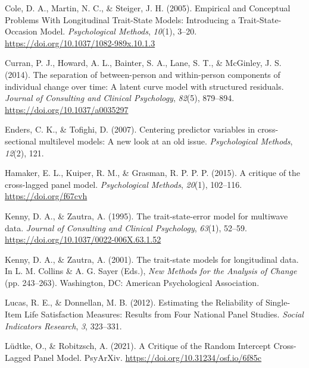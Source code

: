 \documentclass[
  english,
  man,floatsintext]{apa6}
\newlength{\cslhangindent}
\newlength{\cslentryspacingunit} %
\newenvironment{CSLReferences}[2] %
 {%
  \setlength{\parindent}{0pt}
  \ifodd #1
  \let\oldpar\par
  \def\par{\hangindent=\cslhangindent\oldpar}
  \fi
  \setlength{\parskip}{#2\cslentryspacingunit}
 }%
 {}
\begin{document}
\hypertarget{refs}{}
\begin{CSLReferences}{1}{0}
\leavevmode{}%
Cole, D. A., Martin, N. C., \& Steiger, J. H. (2005). Empirical and {Conceptual Problems With Longitudinal Trait-State Models}: {Introducing} a {Trait-State-Occasion Model}. \emph{Psychological Methods}, \emph{10}(1), 3--20. \url{https://doi.org/10.1037/1082-989x.10.1.3}

\leavevmode{}%
Curran, P. J., Howard, A. L., Bainter, S. A., Lane, S. T., \& McGinley, J. S. (2014). The separation of between-person and within-person components of individual change over time: {A} latent curve model with structured residuals. \emph{Journal of Consulting and Clinical Psychology}, \emph{82}(5), 879--894. \url{https://doi.org/10.1037/a0035297}

\leavevmode{}%
Enders, C. K., \& Tofighi, D. (2007). Centering predictor variables in cross-sectional multilevel models: {A} new look at an old issue. \emph{Psychological Methods}, \emph{12}(2), 121.

\leavevmode{}%
Hamaker, E. L., Kuiper, R. M., \& Grasman, R. P. P. P. (2015). A critique of the cross-lagged panel model. \emph{Psychological Methods}, \emph{20}(1), 102--116. \url{https://doi.org/f67cvh}

\leavevmode{}%
Kenny, D. A., \& Zautra, A. (1995). The trait-state-error model for multiwave data. \emph{Journal of Consulting and Clinical Psychology}, \emph{63}(1), 52--59. \url{https://doi.org/10.1037/0022-006X.63.1.52}

\leavevmode{}%
Kenny, D. A., \& Zautra, A. (2001). The trait-state models for longitudinal data. In L. M. Collins \& A. G. Sayer (Eds.), \emph{New {Methods} for the {Analysis} of {Change}} (pp. 243--263). {Washington, DC}: {American Psychological Association}.

\leavevmode{}%
Lucas, R. E., \& Donnellan, M. B. (2012). Estimating the {Reliability} of {Single-Item Life Satisfaction Measures}: {Results} from {Four National Panel Studies}. \emph{Social Indicators Research}, \emph{3}, 323--331.

\leavevmode{}%
Lüdtke, O., \& Robitzsch, A. (2021). A {Critique} of the {Random Intercept Cross-Lagged Panel Model}. {PsyArXiv}. \url{https://doi.org/10.31234/osf.io/6f85c}


\end{CSLReferences}
\end{document}
